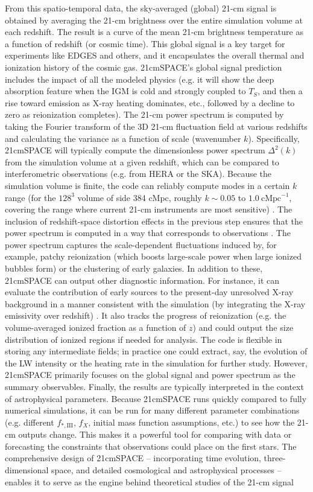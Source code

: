 \documentclass[floats,floatfix,showpacs,amssymb,prd,superscriptaddress,nofootinbib]{revtex4-2} %
\begin{document}
From this spatio-temporal data, the sky-averaged (global) 21-cm signal is obtained by averaging the 21-cm brightness over the entire simulation volume at each redshift. The result is a curve of the mean 21-cm brightness temperature as a function of redshift (or cosmic time). This global signal is a key target for experiments like EDGES and others, and it encapsulates the overall thermal and ionization history of the cosmic gas. 21cmSPACE’s global signal prediction includes the impact of all the modeled physics (e.g. it will show the deep absorption feature when the IGM is cold and strongly coupled to $T_S$, and then a rise toward emission as X-ray heating dominates, etc., followed by a decline to zero as reionization completes). The 21-cm power spectrum is computed by taking the Fourier transform of the 3D 21-cm fluctuation field at various redshifts and calculating the variance as a function of scale (wavenumber $k$). Specifically, 21cmSPACE will typically compute the dimensionless power spectrum $\Delta^2 (k)$ from the simulation volume at a given redshift, which can be compared to interferometric observations (e.g. from HERA or the SKA). Because the simulation volume is finite, the code can reliably compute modes in a certain $k$ range (for the $128^3$ volume of side 384 cMpc, roughly $k \sim 0.05$ to $1.0~\text{cMpc}^{-1}$, covering the range where current 21-cm instruments are most sensitive) \citep{gessey-jones_2024}. The inclusion of redshift-space distortion effects in the previous step ensures that the power spectrum is computed in a way that corresponds to observations \citep{gessey-jones_2024}. The power spectrum captures the scale-dependent fluctuations induced by, for example, patchy reionization (which boosts large-scale power when large ionized bubbles form) or the clustering of early galaxies. In addition to these, 21cmSPACE can output other diagnostic information. For instance, it can evaluate the contribution of early sources to the present-day unresolved X-ray background in a manner consistent with the simulation (by integrating the X-ray emissivity over redshift) \citep{gessey-jones_2024}. It also tracks the progress of reionization (e.g. the volume-averaged ionized fraction as a function of $z$) and could output the size distribution of ionized regions if needed for analysis. The code is flexible in storing any intermediate fields; in practice one could extract, say, the evolution of the LW intensity or the heating rate in the simulation for further study. However, 21cmSPACE primarily focuses on the global signal and power spectrum as the summary observables. Finally, the results are typically interpreted in the context of astrophysical parameters. Because 21cmSPACE runs quickly compared to fully numerical simulations, it can be run for many different parameter combinations (e.g. different $f_{*,\text{III}}$, $f_X$, initial mass function assumptions, etc.) to see how the 21-cm outputs change. This makes it a powerful tool for comparing with data or forecasting the constraints that observations could place on the first stars. The comprehensive design of 21cmSPACE – incorporating time evolution, three-dimensional space, and detailed cosmological and astrophysical processes – enables it to serve as the engine behind theoretical studies of the 21-cm signal 
\end{document}
